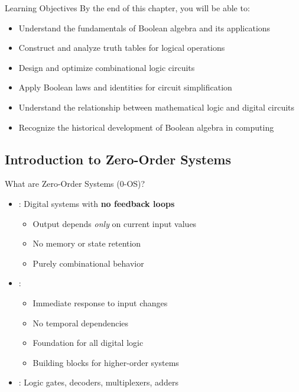\begin{frame}{Learning Objectives}
By the end of this chapter, you will be able to:
\begin{itemize}
\item Understand the fundamentals of Boolean algebra and its applications
\item Construct and analyze truth tables for logical operations
\item Design and optimize combinational logic circuits
\item Apply Boolean laws and identities for circuit simplification
\item Understand the relationship between mathematical logic and digital circuits
\item Recognize the historical development of Boolean algebra in computing
\end{itemize}
\end{frame}

\subsection{Introduction to Zero-Order Systems}

\begin{frame}{What are Zero-Order Systems (0-OS)?}
\begin{itemize}
\item {}: Digital systems with \textbf{no feedback loops}
\begin{itemize}
\item Output depends \textit{only} on current input values
\item No memory or state retention
\item Purely combinational behavior
\end{itemize}
\vspace{0.5cm}
\item {}:
\begin{itemize}
\item Immediate response to input changes
\item No temporal dependencies
\item Foundation for all digital logic
\item Building blocks for higher-order systems
\end{itemize}
\vspace{0.3cm}
\item {}: Logic gates, decoders, multiplexers, adders
\end{itemize}
\end{frame}

